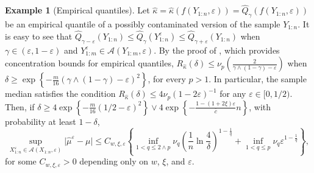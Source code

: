 \documentclass{article}
\theoremstyle{plain}
\theoremstyle{definition}
\newtheorem{example}{Example}
\def\sA{\mathcal{A}}
\begin{document}
\begin{example}[Empirical quantiles]\label{ex:empirical_quantiles}
  Let \( \widehat{\kappa }= \widehat{\kappa }(f(Y_{1:n},\varepsilon ))= \widehat{Q}_\gamma(f(Y_{1:n},\varepsilon )) \) be an empirical quantile of a possibly contaminated version of the sample \( Y_{1:n} \). It is easy to see that \( \widehat{Q}_{\gamma -\varepsilon}(Y_{1:n})\le \widehat{Q}_{\gamma }(Y_{1:n}^{\varepsilon}) \le \widehat{Q}_{\gamma +\varepsilon}(Y_{1:n})   \) when \( \gamma \in (\varepsilon,1-\varepsilon ) \) and \( Y_{1:m}^\varepsilon \in \sA(Y_{1:m},\varepsilon ) \). By the proof of , which provides concentration bounds for empirical quantiles, \( R_{\widehat{\kappa }}  (\delta )\le \nu _p\left(\frac{2}{\gamma \wedge (1-\gamma )-\varepsilon  }\right) \) when \( \delta \ge \exp\left\{-\frac{m}{16}(\gamma \wedge (1-\gamma )-\varepsilon)^2 \right\} \), for every \( p>1 \). In particular, the sample median satisfies the condition \( R_{\widehat{\kappa}}(\delta)\le 4\nu _p(1-2\varepsilon )^{-1}    \) for any \( \varepsilon \in [0, 1/2) \). Then, if \( \delta \ge 4\exp\left\{-\frac{m}{16}\left(1 / 2-\varepsilon\right)^2 \right\}\vee 4\exp \left\{-\frac{1-(1+2\xi )\varepsilon }{\overline{c}}n\right\}   \), with probability at least \( 1-\delta  \), 
  \begin{equation}\label{eq:median_concentration}
    \sup_{X_{1:n}^\varepsilon \in \sA(X_{1:n},\varepsilon )}\lvert \widehat{\mu }^\varepsilon-\mu   \rvert  \le C_{w,\xi ,\varepsilon} \left\{ \inf_{1<q\le 2 \wedge p} \nu _q\left(\frac{1}{n} \ln \frac{4}{\delta }\right)^{1-\frac{1}{q}}+ \inf_{1<q \le p} \nu_q \varepsilon^{1-\frac{1}{q}}\right\},  
  \end{equation}  
  for some \( C_{w,\xi ,\varepsilon }>0 \) depending only on \( w \), \( \xi  \), and \( \varepsilon  \).
\end{example}
\end{document}
